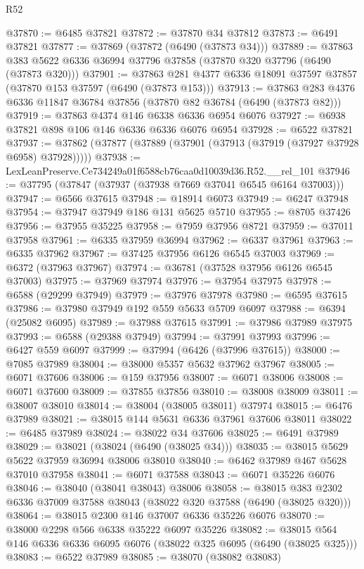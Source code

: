 \begin{lexlean}{R52}
\begin{coremodule}
@37870 := @6485 @37821
@37872 := @37870 @34 @37812
@37873 := @6491 @37821
@37877 := @37869 (@37872 (@6490 (@37873 @34)))
@37889 := @37863 @383 @5622 @6336 @36994 @37796 @37858 (@37870 @320 @37796 (@6490 (@37873 @320)))
@37901 := @37863 @281 @4377 @6336 @18091 @37597 @37857 (@37870 @153 @37597 (@6490 (@37873 @153)))
@37913 := @37863 @283 @4376 @6336 @11847 @36784 @37856 (@37870 @82 @36784 (@6490 (@37873 @82)))
@37919 := @37863 @4374 @146 @6338 @6336 @6954 @6076
@37927 := @6938 @37821 @898 @106 @146 @6336 @6336 @6076 @6954
@37928 := @6522 @37821
@37937 := @37862 (@37877 (@37889 (@37901 (@37913 (@37919 (@37927 @37928 @6958) @37928)))))
@37938 := LexLeanPreserve.Ce734249a01f6588cb76caa0d10039d36.R52.__rel_101
@37946 := @37795 (@37847 (@37937 (@37938 @7669 @37041 @6545 @6164 @37003)))
@37947 := @6566 @37615
@37948 := @18914 @6073
@37949 := @6247 @37948
@37954 := @37947 @37949 @186 @131 @5625 @5710
@37955 := @8705 @37426
@37956 := @37955 @35225
@37958 := @7959 @37956 @8721
@37959 := @37011 @37958
@37961 := @6335 @37959 @36994
@37962 := @6337 @37961
@37963 := @6335 @37962
@37967 := @37425 @37956 @6126 @6545 @37003
@37969 := @6372 (@37963 @37967)
@37974 := @36781 (@37528 @37956 @6126 @6545 @37003)
@37975 := @37969 @37974
@37976 := @37954 @37975
@37978 := @6588 (@29299 @37949)
@37979 := @37976 @37978
@37980 := @6595 @37615
@37986 := @37980 @37949 @192 @559 @5633 @5709 @6097
@37988 := @6394 (@25082 @6095)
@37989 := @37988 @37615
@37991 := @37986 @37989 @37975
@37993 := @6588 (@29388 @37949)
@37994 := @37991 @37993
@37996 := @6427 @559 @6097
@37999 := @37994 (@6426 (@37996 @37615))
@38000 := @7085 @37989
@38004 := @38000 @5357 @5632 @37962 @37967
@38005 := @6071 @37606
@38006 := @159 @37956
@38007 := @6071 @38006
@38008 := @6071 @37600
@38009 := @37855 @37856
@38010 := @38008 @38009
@38011 := @38007 @38010
@38014 := @38004 (@38005 @38011) @37974
@38015 := @6476 @37989
@38021 := @38015 @144 @5631 @6336 @37961 @37606 @38011
@38022 := @6485 @37989
@38024 := @38022 @34 @37606
@38025 := @6491 @37989
@38029 := @38021 (@38024 (@6490 (@38025 @34)))
@38035 := @38015 @5629 @5622 @37959 @36994 @38006 @38010
@38040 := @6462 @37989 @467 @5628 @37010 @37958
@38041 := @6071 @37588
@38043 := @6071 @35226 @6076
@38046 := @38040 (@38041 @38043) @38006
@38058 := @38015 @383 @2302 @6336 @37009 @37588 @38043 (@38022 @320 @37588 (@6490 (@38025 @320)))
@38064 := @38015 @2300 @146 @37007 @6336 @35226 @6076
@38070 := @38000 @2298 @566 @6338 @35222 @6097 @35226
@38082 := @38015 @564 @146 @6336 @6336 @6095 @6076 (@38022 @325 @6095 (@6490 (@38025 @325)))
@38083 := @6522 @37989
@38085 := @38070 (@38082 @38083)

\end{coremodule}
\end{lexlean}
